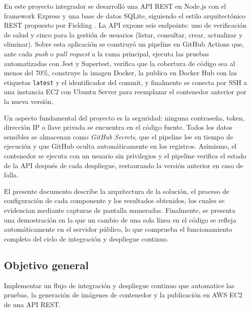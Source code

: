 \documentclass[12pt,letterpaper]{article}
\begin{document}
En este proyecto integrador se desarrolló una API REST en Node.js con el framework Express y una base de datos SQLite, siguiendo el estilo arquitectónico REST propuesto por Fielding \cite{fielding}. La API expone seis endpoints: uno de verificación de salud y cinco para la gestión de usuarios (listar, consultar, crear, actualizar y eliminar). Sobre esta aplicación se construyó un pipeline en GitHub Actions \cite{githubactions} que, ante cada \emph{push} o \emph{pull request} a la rama principal, ejecuta las pruebas automatizadas con Jest y Supertest, verifica que la cobertura de código sea al menos del 70\%, construye la imagen Docker, la publica en Docker Hub con las etiquetas \texttt{latest} y el identificador del commit, y finalmente se conecta por SSH a una instancia EC2 con Ubuntu Server para reemplazar el contenedor anterior por la nueva versión.

Un aspecto fundamental del proyecto es la seguridad: ninguna contraseña, token, dirección IP o llave privada se encuentra en el código fuente. Todos los datos sensibles se almacenan como \emph{GitHub Secrets}, que el pipeline lee en tiempo de ejecución y que GitHub oculta automáticamente en los registros. Asimismo, el contenedor se ejecuta con un usuario sin privilegios y el pipeline verifica el estado de la API después de cada despliegue, restaurando la versión anterior en caso de falla.

El presente documento describe la arquitectura de la solución, el proceso de configuración de cada componente y los resultados obtenidos, los cuales se evidencian mediante capturas de pantalla numeradas. Finalmente, se presenta una demostración en la que un cambio de una sola línea en el código se refleja automáticamente en el servidor público, lo que comprueba el funcionamiento completo del ciclo de integración y despliegue continuo.

\subsection{Objetivo general}
Implementar un flujo de integración y despliegue continuo que automatice las pruebas, la generación de imágenes de contenedor y la publicación en AWS EC2 de una API REST.
\end{document}
